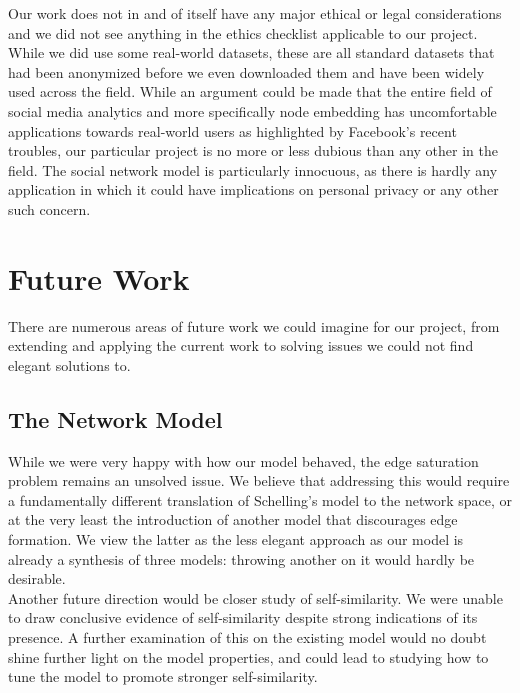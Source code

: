 \documentclass[12pt,twoside]{report}
\begin{document}
Our work does not in and of itself have any major ethical or legal considerations and we did not see anything in the ethics checklist applicable to our project. While we did use some real-world datasets, these are all standard datasets that had been anonymized before we even downloaded them and have been widely used across the field. While an argument could be made that the entire field of social media analytics and more specifically node embedding has uncomfortable applications towards real-world users as highlighted by Facebook's recent troubles, our particular project is no more or less dubious than any other in the field. The social network model is particularly innocuous, as there is hardly any application in which it could have implications on personal privacy or any other such concern. \\

\section{Future Work}

There are numerous areas of future work we could imagine for our project, from extending and applying the current work to solving issues we could not find elegant solutions to. \\

\subsection{The Network Model}

While we were very happy with how our model behaved, the edge saturation problem remains an unsolved issue. We believe that addressing this would require a fundamentally different translation of Schelling's model to the network space, or at the very least the introduction of another model that discourages edge formation. We view the latter as the less elegant approach as our model is already a synthesis of three models: throwing another on it would hardly be desirable. \\

Another future direction would be closer study of self-similarity. We were unable to draw conclusive evidence of self-similarity despite strong indications of its presence. A further examination of this on the existing model would no doubt shine further light on the model properties, and could lead to studying how to tune the model to promote stronger self-similarity. \\
\end{document}
